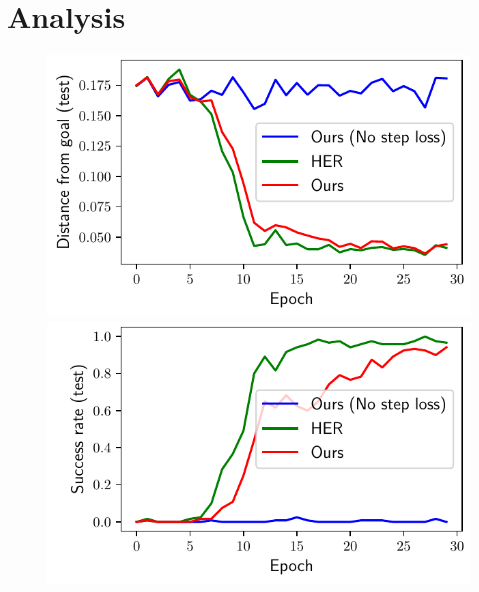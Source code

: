 \section{Analysis}
%
\begin{figure}%
  \def\frac{0.5}
  \begin{minipage}[b]{0.5\linewidth}
    \centering
    \includegraphics[width=\frac\columnwidth]{media/res/ablate-ddpg-with-without-step-loss/FetchPush-6efc1de-ddpgepoch-test/ag_g_dist.pdf}%
    \includegraphics[width=\frac\columnwidth]{media/res/ablate-ddpg-with-without-step-loss/FetchPush-6efc1de-ddpgepoch-test/success_rate.pdf}\\
    \label{fig:with-and-without-step-loss-a}
  \end{minipage}
  \begin{minipage}[b]{0.5\linewidth}
    \centering

\end{minipage}
\end{figure}
